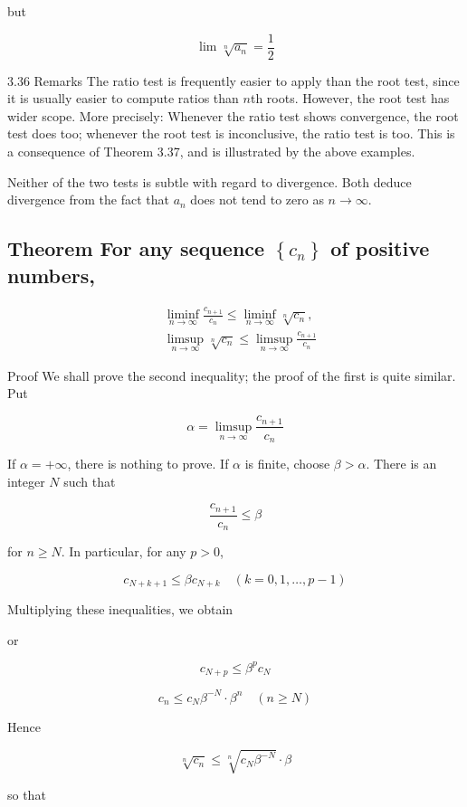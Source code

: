 \documentclass[10pt]{article}
\begin{document}
but

$$
\lim \sqrt[n]{a_{n}}=\frac{1}{2}
$$

3.36 Remarks The ratio test is frequently easier to apply than the root test, since it is usually easier to compute ratios than $n$th roots. However, the root test has wider scope. More precisely: Whenever the ratio test shows convergence, the root test does too; whenever the root test is inconclusive, the ratio test is too. This is a consequence of Theorem 3.37, and is illustrated by the above examples.

Neither of the two tests is subtle with regard to divergence. Both deduce divergence from the fact that $a_{n}$ does not tend to zero as $n \rightarrow \infty$.

\subsection{Theorem For any sequence $\left\{c_{n}\right\}$ of positive numbers,}
$$
\begin{aligned}
& \liminf _{n \rightarrow \infty} \frac{c_{n+1}}{c_{n}} \leq \liminf _{n \rightarrow \infty} \sqrt[n]{c_{n}}, \\
& \limsup _{n \rightarrow \infty} \sqrt[n]{c_{n}} \leq \limsup _{n \rightarrow \infty} \frac{c_{n+1}}{c_{n}}
\end{aligned}
$$

Proof We shall prove the second inequality; the proof of the first is quite similar. Put

$$
\alpha=\limsup _{n \rightarrow \infty} \frac{c_{n+1}}{c_{n}}
$$

If $\alpha=+\infty$, there is nothing to prove. If $\alpha$ is finite, choose $\beta>\alpha$. There is an integer $N$ such that

$$
\frac{c_{n+1}}{c_{n}} \leq \beta
$$

for $n \geq N$. In particular, for any $p>0$,

$$
c_{N+k+1} \leq \beta c_{N+k} \quad(k=0,1, \ldots, p-1)
$$

Multiplying these inequalities, we obtain

or

$$
c_{N+p} \leq \beta^{p} c_{N}
$$

$$
c_{n} \leq c_{N} \beta^{-N} \cdot \beta^{n} \quad(n \geq N)
$$

Hence

$$
\sqrt[n]{c_{n}} \leq \sqrt[n]{c_{N} \beta^{-N}} \cdot \beta
$$

so that
\end{document}
